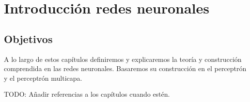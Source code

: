 
\chapter{Introducción redes neuronales}
\section{Objetivos}  

A lo largo de estos capítulos definiremos y explicaremos la teoría y
construcción comprendida en las redes neuronales.  Basaremos su
construcción en el perceptrón y el perceptrón multicapa. 

TODO: Añadir referencias a los capítulos cuando estén. 